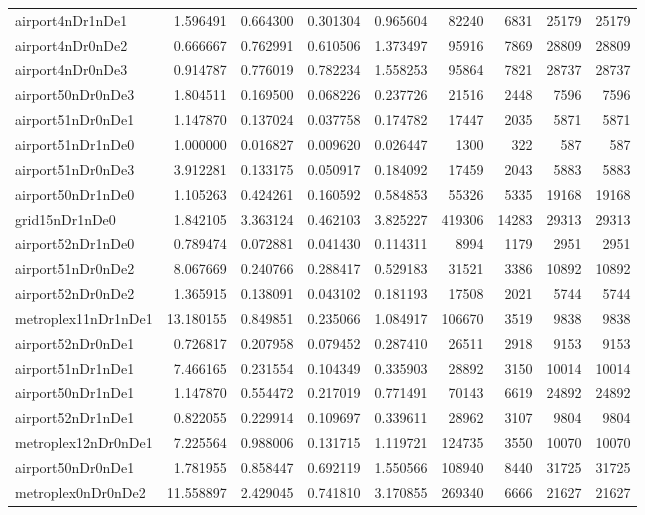 \begin{longtable}{|l|r|r|r|r|r|r|r|r|}
airport4nDr1nDe1 & 1.596491 & 0.664300 & 0.301304 & 0.965604 & 82240 & 6831 & 25179 & 25179 \\
airport4nDr0nDe2 & 0.666667 & 0.762991 & 0.610506 & 1.373497 & 95916 & 7869 & 28809 & 28809 \\
airport4nDr0nDe3 & 0.914787 & 0.776019 & 0.782234 & 1.558253 & 95864 & 7821 & 28737 & 28737 \\
airport50nDr0nDe3 & 1.804511 & 0.169500 & 0.068226 & 0.237726 & 21516 & 2448 & 7596 & 7596 \\
airport51nDr0nDe1 & 1.147870 & 0.137024 & 0.037758 & 0.174782 & 17447 & 2035 & 5871 & 5871 \\
airport51nDr1nDe0 & 1.000000 & 0.016827 & 0.009620 & 0.026447 & 1300 & 322 & 587 & 587 \\
airport51nDr0nDe3 & 3.912281 & 0.133175 & 0.050917 & 0.184092 & 17459 & 2043 & 5883 & 5883 \\
airport50nDr1nDe0 & 1.105263 & 0.424261 & 0.160592 & 0.584853 & 55326 & 5335 & 19168 & 19168 \\
grid15nDr1nDe0 & 1.842105 & 3.363124 & 0.462103 & 3.825227 & 419306 & 14283 & 29313 & 29313 \\
airport52nDr1nDe0 & 0.789474 & 0.072881 & 0.041430 & 0.114311 & 8994 & 1179 & 2951 & 2951 \\
airport51nDr0nDe2 & 8.067669 & 0.240766 & 0.288417 & 0.529183 & 31521 & 3386 & 10892 & 10892 \\
airport52nDr0nDe2 & 1.365915 & 0.138091 & 0.043102 & 0.181193 & 17508 & 2021 & 5744 & 5744 \\
metroplex11nDr1nDe1 & 13.180155 & 0.849851 & 0.235066 & 1.084917 & 106670 & 3519 & 9838 & 9838 \\
airport52nDr0nDe1 & 0.726817 & 0.207958 & 0.079452 & 0.287410 & 26511 & 2918 & 9153 & 9153 \\
airport51nDr1nDe1 & 7.466165 & 0.231554 & 0.104349 & 0.335903 & 28892 & 3150 & 10014 & 10014 \\
airport50nDr1nDe1 & 1.147870 & 0.554472 & 0.217019 & 0.771491 & 70143 & 6619 & 24892 & 24892 \\
airport52nDr1nDe1 & 0.822055 & 0.229914 & 0.109697 & 0.339611 & 28962 & 3107 & 9804 & 9804 \\
metroplex12nDr0nDe1 & 7.225564 & 0.988006 & 0.131715 & 1.119721 & 124735 & 3550 & 10070 & 10070 \\
airport50nDr0nDe1 & 1.781955 & 0.858447 & 0.692119 & 1.550566 & 108940 & 8440 & 31725 & 31725 \\
metroplex0nDr0nDe2 & 11.558897 & 2.429045 & 0.741810 & 3.170855 & 269340 & 6666 & 21627 & 21627 \\

\end{longtable}
